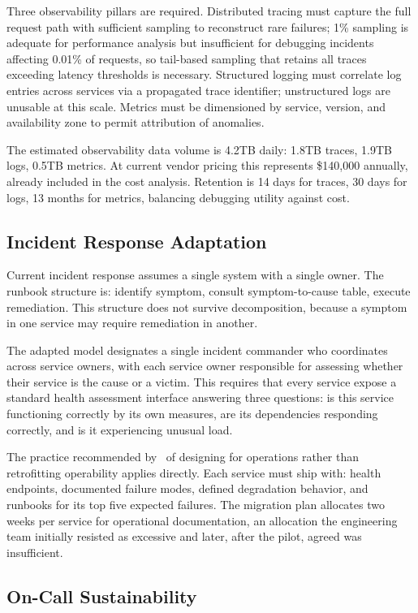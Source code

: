 Three observability pillars are required. Distributed tracing must capture the full request path with sufficient sampling to reconstruct rare failures; 1\% sampling is adequate for performance analysis but insufficient for debugging incidents affecting 0.01\% of requests, so tail-based sampling that retains all traces exceeding latency thresholds is necessary. Structured logging must correlate log entries across services via a propagated trace identifier; unstructured logs are unusable at this scale. Metrics must be dimensioned by service, version, and availability zone to permit attribution of anomalies.

The estimated observability data volume is 4.2TB daily: 1.8TB traces, 1.9TB logs, 0.5TB metrics. At current vendor pricing this represents \$140,000 annually, already included in the cost analysis. Retention is 14 days for traces, 30 days for logs, 13 months for metrics, balancing debugging utility against cost.

\subsection{Incident Response Adaptation}

Current incident response assumes a single system with a single owner. The runbook structure is: identify symptom, consult symptom-to-cause table, execute remediation. This structure does not survive decomposition, because a symptom in one service may require remediation in another.

The adapted model designates a single incident commander who coordinates across service owners, with each service owner responsible for assessing whether their service is the cause or a victim. This requires that every service expose a standard health assessment interface answering three questions: is this service functioning correctly by its own measures, are its dependencies responding correctly, and is it experiencing unusual load.

The practice recommended by~\cite{hamilton-on-designing-2007} of designing for operations rather than retrofitting operability applies directly. Each service must ship with: health endpoints, documented failure modes, defined degradation behavior, and runbooks for its top five expected failures. The migration plan allocates two weeks per service for operational documentation, an allocation the engineering team initially resisted as excessive and later, after the pilot, agreed was insufficient.

\subsection{On-Call Sustainability}

